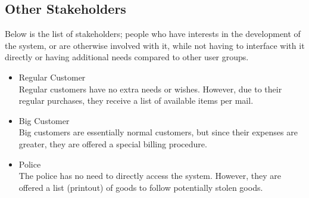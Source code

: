 \documentclass{article}
\begin{document}
\subsection*{Other Stakeholders}
Below is the list of stakeholders; people who have interests in the development of the system, or are otherwise involved with it, while not having to interface with it directly or having additional needs compared to other user groups.
\begin{itemize}[noitemsep]
	\item Regular Customer\\
		Regular customers have no extra needs or wishes. However, due to their regular purchases, they receive a list of available items per mail.
	\item Big Customer\\
		Big customers are essentially normal customers, but since their expenses are greater, they are offered a special billing procedure.
	\item Police\\
		The police has no need to directly access the system. However, they are offered a list (printout) of goods to follow potentially stolen goods.
\end{itemize}
\end{document}
